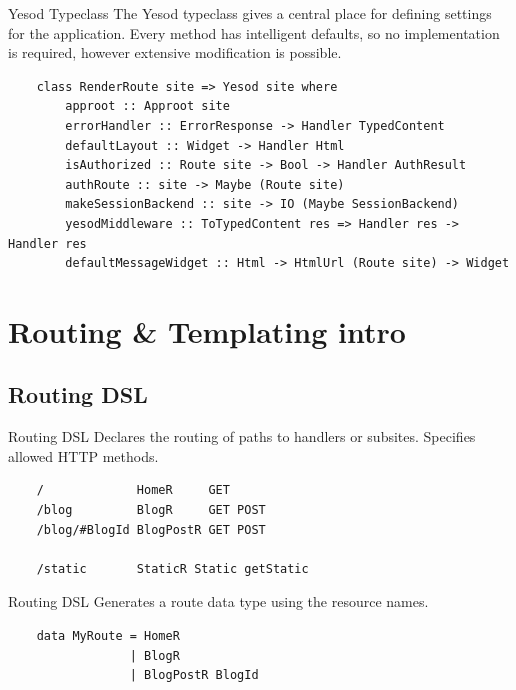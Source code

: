 \documentclass[pdf]{beamer}
\begin{document}
\begin{frame}[fragile]{Yesod Typeclass}
  The Yesod typeclass gives a central place for defining settings for
  the application. Every method has intelligent defaults, so no
  implementation is required, however extensive modification is
  possible.

  \begin{verbatim}
    class RenderRoute site => Yesod site where
        approot :: Approot site
        errorHandler :: ErrorResponse -> Handler TypedContent
        defaultLayout :: Widget -> Handler Html
        isAuthorized :: Route site -> Bool -> Handler AuthResult
        authRoute :: site -> Maybe (Route site)
        makeSessionBackend :: site -> IO (Maybe SessionBackend)
        yesodMiddleware :: ToTypedContent res => Handler res -> Handler res
        defaultMessageWidget :: Html -> HtmlUrl (Route site) -> Widget
  \end{verbatim}
\end{frame}

\section{Routing \& Templating intro}
\subsection{Routing DSL}
\begin{frame}[fragile]{Routing DSL}
  Declares the routing of paths to handlers or subsites. Specifies
  allowed HTTP methods.

  \begin{verbatim}
    /             HomeR     GET
    /blog         BlogR     GET POST
    /blog/#BlogId BlogPostR GET POST

    /static       StaticR Static getStatic
  \end{verbatim}
\end{frame}

\begin{frame}[fragile]{Routing DSL}
  Generates a route data type using the resource names.
  \begin{verbatim}
    data MyRoute = HomeR
                 | BlogR
                 | BlogPostR BlogId
  \end{verbatim}
\end{frame}
\end{document}
